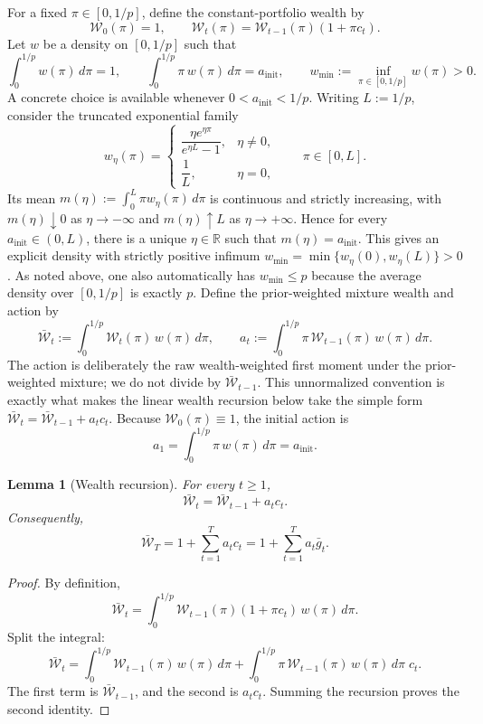 \documentclass[11pt]{article}
\newtheorem{lemma}{Lemma}
\newcommand{\R}{\mathbb{R}}
\newcommand{\1}{\mathbf{1}}
\begin{document}
For a fixed \(\pi\in[0,1/p]\), define the constant-portfolio wealth by
\[
\mathcal W_0(\pi)=1,
\qquad
\mathcal W_t(\pi)=\mathcal W_{t-1}(\pi)(1+\pi c_t).
\]
Let \(w\) be a density on \([0,1/p]\) such that
\[
\int_0^{1/p}w(\pi)\,d\pi=1,
\qquad
\int_0^{1/p}\pi\,w(\pi)\,d\pi=a_{\mathrm{init}},
\qquad
w_{\min}:=\inf_{\pi\in[0,1/p]}w(\pi)>0.
\]
A concrete choice is available whenever \(0<a_{\mathrm{init}}<1/p\). Writing \(L:=1/p\), consider the truncated exponential family
\[
w_\eta(\pi)=
\begin{cases}
\dfrac{\eta e^{\eta \pi}}{e^{\eta L}-1}, & \eta\neq 0,\\[1.2ex]
\dfrac{1}{L}, & \eta=0,
\end{cases}
\qquad \pi\in[0,L].
\]
Its mean \(m(\eta):=\int_0^L \pi w_\eta(\pi)\,d\pi\) is continuous and strictly increasing, with \(m(\eta)\downarrow 0\) as \(\eta\to-\infty\) and \(m(\eta)\uparrow L\) as \(\eta\to+\infty\). Hence for every \(a_{\mathrm{init}}\in(0,L)\), there is a unique \(\eta\in\R\) such that \(m(\eta)=a_{\mathrm{init}}\). This gives an explicit density with strictly positive infimum \(w_{\min}=\min\{w_\eta(0),w_\eta(L)\}>0\). As noted above, one also automatically has \(w_{\min}\le p\) because the average density over \([0,1/p]\) is exactly \(p\).
Define the prior-weighted mixture wealth and action by
\[
\bar{\mathcal W}_t
:=
\int_0^{1/p}\mathcal W_t(\pi)\,w(\pi)\,d\pi,
\qquad
a_t
:=
\int_0^{1/p}\pi\,\mathcal W_{t-1}(\pi)\,w(\pi)\,d\pi.
\]
The action is deliberately the raw wealth-weighted first moment under the prior-weighted mixture; we do not divide by \(\bar{\mathcal W}_{t-1}\). This unnormalized convention is exactly what makes the linear wealth recursion below take the simple form \(\bar{\mathcal W}_t=\bar{\mathcal W}_{t-1}+a_t c_t\).
Because \(\mathcal W_0(\pi)\equiv 1\), the initial action is
\[
a_1=\int_0^{1/p}\pi\,w(\pi)\,d\pi=a_{\mathrm{init}}.
\]

\begin{lemma}[Wealth recursion]
\label{lem:app-wealth-recursion}
For every \(t\ge 1\),
\[
\bar{\mathcal W}_t
=
\bar{\mathcal W}_{t-1}+a_t c_t.
\]
Consequently,
\[
\bar{\mathcal W}_T
=
1+\sum_{t=1}^T a_t c_t
=
1+\sum_{t=1}^T a_t\bar g_t.
\]
\end{lemma}

\begin{proof}
By definition,
\[
\bar{\mathcal W}_t
=
\int_0^{1/p}\mathcal W_{t-1}(\pi)(1+\pi c_t)\,w(\pi)\,d\pi.
\]
Split the integral:
\[
\bar{\mathcal W}_t
=
\int_0^{1/p}\mathcal W_{t-1}(\pi)\,w(\pi)\,d\pi
+
\int_0^{1/p}\pi\,\mathcal W_{t-1}(\pi)\,w(\pi)\,d\pi\; c_t.
\]
The first term is \(\bar{\mathcal W}_{t-1}\), and the second is \(a_t c_t\). Summing the recursion proves the second identity.
\end{proof}
\end{document}
